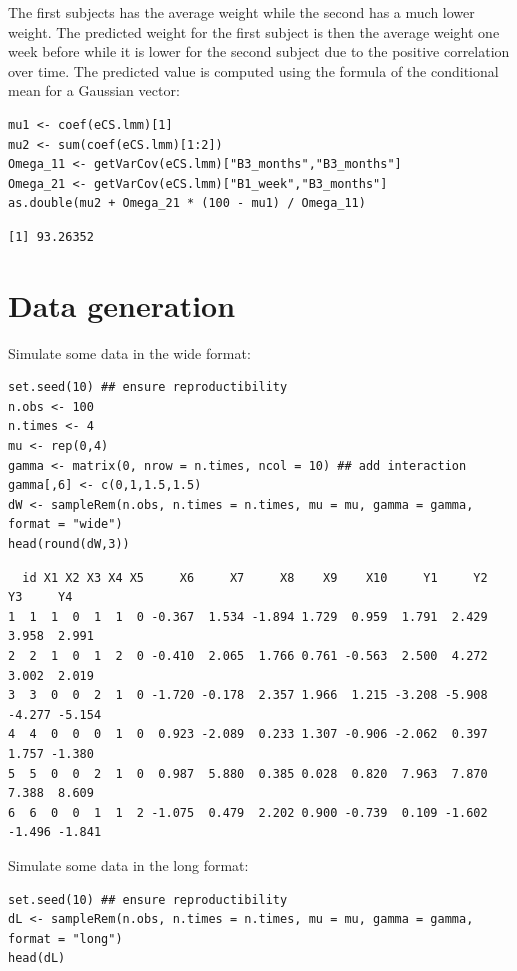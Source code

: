 \documentclass[12pt]{article}
\begin{document}
The first subjects has the average weight while the second has a much
  lower weight. The predicted weight for the first subject is then the
  average weight one week before while it is lower for the second
  subject due to the positive correlation over time. The predicted
  value is computed using the formula of the conditional mean for a
  Gaussian vector:
\lstset{language=r,label= ,caption= ,captionpos=b,numbers=none}
\begin{lstlisting}
mu1 <- coef(eCS.lmm)[1]
mu2 <- sum(coef(eCS.lmm)[1:2])
Omega_11 <- getVarCov(eCS.lmm)["B3_months","B3_months"]
Omega_21 <- getVarCov(eCS.lmm)["B1_week","B3_months"]
as.double(mu2 + Omega_21 * (100 - mu1) / Omega_11)
\end{lstlisting}

\begin{verbatim}
[1] 93.26352
\end{verbatim}



\clearpage

\section{Data generation}
\label{sec:org56c05de}
Simulate some data in the wide format:
\lstset{language=r,label= ,caption= ,captionpos=b,numbers=none}
\begin{lstlisting}
set.seed(10) ## ensure reproductibility
n.obs <- 100
n.times <- 4
mu <- rep(0,4)
gamma <- matrix(0, nrow = n.times, ncol = 10) ## add interaction
gamma[,6] <- c(0,1,1.5,1.5)
dW <- sampleRem(n.obs, n.times = n.times, mu = mu, gamma = gamma, format = "wide")
head(round(dW,3))
\end{lstlisting}

\begin{verbatim}
  id X1 X2 X3 X4 X5     X6     X7     X8    X9    X10     Y1     Y2     Y3     Y4
1  1  1  0  1  1  0 -0.367  1.534 -1.894 1.729  0.959  1.791  2.429  3.958  2.991
2  2  1  0  1  2  0 -0.410  2.065  1.766 0.761 -0.563  2.500  4.272  3.002  2.019
3  3  0  0  2  1  0 -1.720 -0.178  2.357 1.966  1.215 -3.208 -5.908 -4.277 -5.154
4  4  0  0  0  1  0  0.923 -2.089  0.233 1.307 -0.906 -2.062  0.397  1.757 -1.380
5  5  0  0  2  1  0  0.987  5.880  0.385 0.028  0.820  7.963  7.870  7.388  8.609
6  6  0  0  1  1  2 -1.075  0.479  2.202 0.900 -0.739  0.109 -1.602 -1.496 -1.841
\end{verbatim}


Simulate some data in the long format:
\lstset{language=r,label= ,caption= ,captionpos=b,numbers=none}
\begin{lstlisting}
set.seed(10) ## ensure reproductibility
dL <- sampleRem(n.obs, n.times = n.times, mu = mu, gamma = gamma, format = "long")
head(dL)
\end{lstlisting}
\end{document}
